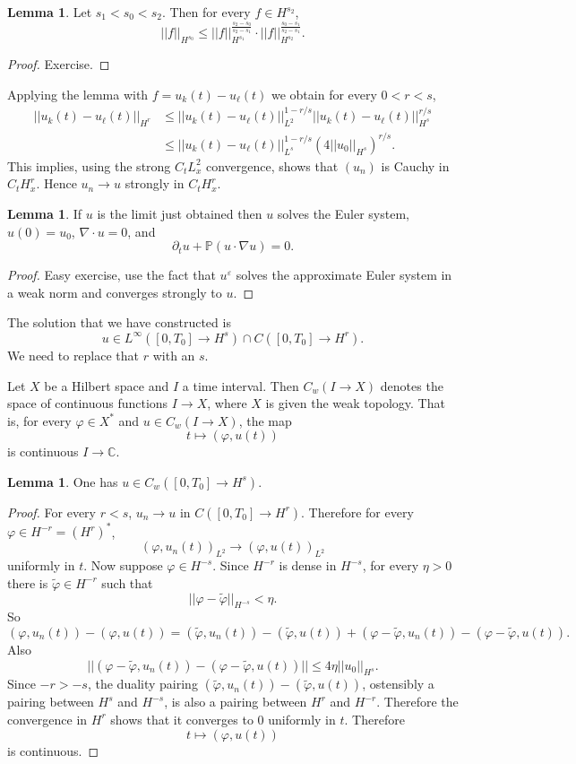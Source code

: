 \documentclass[12pt]{book}
\newcommand{\CC}{\mathbb{C}}
\newcommand{\PP}{\mathbb{P}}
\theoremstyle{definition}
\newtheorem{lemma}[theorem]{Lemma}
\begin{document}
\begin{lemma}
Let $s_1 < s_0 < s_2$.
Then for every $f \in H^{s_2}$,
$$||f||_{H^{s_0}} \leq ||f||_{H^{s_1}}^{\frac{s_2 - s_0}{s_2 - s_1}} \cdot ||f||_{H^{s_2}}^{\frac{s_0 - s_1}{s_2 - s_1}}.$$
\end{lemma}
\begin{proof}
Exercise.
\end{proof}

Applying the lemma with $f = u_k(t) - u_\ell(t)$ we obtain for every $0 < r < s$,
\begin{align*}
||u_k(t) - u_\ell(t)||_{H^r} &\leq ||u_k(t) - u_\ell(t)||_{L^2}^{1-r/s} ||u_k(t) - u_\ell(t)||_{H^s}^{r/s}\\
&\leq ||u_k(t) - u_\ell(t)||_{L^s}^{1-r/s} (4||u_0||_{H^s})^{r/s}.
\end{align*}
This implies, using the strong $C_t L^2_x$ convergence, shows that $(u_n)$ is Cauchy in $C_t H^r_x$.
Hence $u_n \to u$ strongly in $C_t H^r_x$.

\begin{lemma}
If $u$ is the limit just obtained then $u$ solves the Euler system, $u(0) = u_0$, $\nabla \cdot u = 0$, and
$$\partial_t u + \PP(u \cdot \nabla u) = 0.$$
\end{lemma}
\begin{proof}
Easy exercise, use the fact that $u^\varepsilon$ solves the approximate Euler system in a weak norm and converges strongly to $u$.
\end{proof}

The solution that we have constructed is
$$u \in L^\infty([0, T_0] \to H^s) \cap C([0, T_0] \to H^r).$$
We need to replace that $r$ with an $s$.

Let $X$ be a Hilbert space and $I$ a time interval. Then $C_w(I \to X)$ denotes the space of continuous functions $I \to X$, where $X$ is given the weak topology.
That is, for every $\varphi \in X^*$ and $u \in C_w(I \to X)$, the map
$$t \mapsto (\varphi, u(t))$$
is continuous $I \to \CC$.

\begin{lemma}
One has $u \in C_w([0, T_0] \to H^s)$.
\end{lemma}
\begin{proof}
For every $r < s$, $u_n \to u$ in $C([0, T_0] \to H^r)$.
Therefore for every $\varphi \in H^{-r} = (H^r)^*$,
$$(\varphi, u_n(t))_{L^2} \to (\varphi, u(t))_{L^2}$$
uniformly in $t$.
Now suppose $\varphi \in H^{-s}$.
Since $H^{-r}$ is dense in $H^{-s}$, for every $\eta > 0$ there is $\tilde \varphi \in H^{-r}$ such that
$$||\varphi - \tilde \varphi||_{H^{-s}} < \eta.$$
So
$$(\varphi, u_n(t)) - (\varphi, u(t)) = (\tilde \varphi, u_n(t)) - (\tilde \varphi, u(t)) + (\varphi - \tilde \varphi, u_n(t)) - (\varphi - \tilde \varphi, u(t)).$$
Also
$$||(\varphi - \tilde \varphi, u_n(t)) - (\varphi - \tilde \varphi, u(t))|| \leq 4\eta ||u_0||_{H^s}.$$
Since $-r > -s$, the duality pairing $(\tilde \varphi, u_n(t)) - (\tilde \varphi, u(t))$, ostensibly a pairing between $H^s$ and $H^{-s}$, is also a pairing between $H^r$ and $H^{-r}$.
Therefore the convergence in $H^r$ shows that it converges to $0$ uniformly in $t$.
Therefore
$$t \mapsto (\varphi, u(t))$$
is continuous.
\end{proof}
\end{document}

